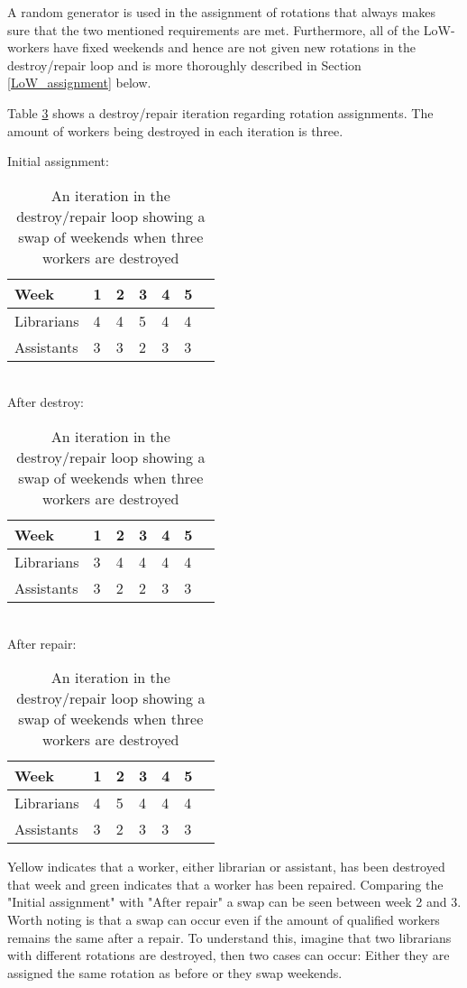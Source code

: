A random generator is used in the assignment of rotations that always makes sure that the two mentioned requirements are met. Furthermore, all of the LoW-workers have fixed weekends and hence are not given new rotations in the destroy/repair loop and is more thoroughly described in Section \ref{LoW_assignment} below. 

Table \ref{rotation_assignment} shows a destroy/repair iteration regarding rotation assignments. The amount of workers being destroyed in each iteration is three.

\begin{table}[!h]
\centering
\caption{An iteration in the destroy/repair loop showing a swap of weekends when three workers are destroyed}
\label{rotation_assignment}
Initial assignment:\\
\begin{tabular}{l|llllll}
\rowcolor[HTML]{C0C0C0}
Week       & 1 & 2 & 3 & 4 & 5  \\ \hline
Librarians & 4 & 4 & 5 & 4 & 4  \\ \hline
Assistants & 3 & 3 & 2 & 3 & 3 
\end{tabular}\\
After destroy:\\
\begin{tabular}{l|llllll}
\rowcolor[HTML]{C0C0C0}
Week       & 1                         & 2                         & 3                         & 4                         & 5                          \\ \hline
Librarians & \cellcolor[HTML]{FFFE65}3 & 4 & \cellcolor[HTML]{FFFE65}4 & 4 & 4  \\ \hline
Assistants & 3 & \cellcolor[HTML]{FFFE65}2 & 2 & 3 & 3
\end{tabular}\\
After repair:\\
\begin{tabular}{l|llllll}
\rowcolor[HTML]{C0C0C0}
Week       & 1 & 2 & 3 & 4 & 5  \\ \hline
Librarians & \cellcolor[HTML]{9AFF99}4 & \cellcolor[HTML]{9AFF99}5 & 4 & 4 & 4  \\ \hline
Assistants & 3 & 2 & \cellcolor[HTML]{9AFF99}3 & 3 & 3 
\end{tabular}
\end{table}

Yellow indicates that a worker, either librarian or assistant, has been destroyed that week and green indicates that a worker has been repaired. Comparing the "Initial assignment" with "After repair" a swap can be seen between week 2 and 3. Worth noting is that a swap can occur even if the amount of qualified workers remains the same after a repair. To understand this, imagine that two librarians with different rotations are destroyed, then two cases can occur: Either they are assigned the same rotation as before or they swap weekends. 


